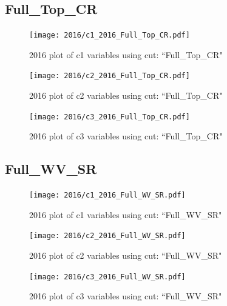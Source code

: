 \documentclass{article}
\begin{document}
      \subsection*{Full\_Top\_CR}
                        \begin{figure}[H]
                            \centering
                            \caption{2016 plot of c1 variables using cut: ``Full\_Top\_CR"}
                            \texttt{[image: 2016/c1\_2016\_Full\_Top\_CR.pdf]}
                        \end{figure}    
                        \begin{figure}[H]
                            \centering
                            \caption{2016 plot of c2 variables using cut: ``Full\_Top\_CR"}
                            \texttt{[image: 2016/c2\_2016\_Full\_Top\_CR.pdf]}
                        \end{figure}    
                        \begin{figure}[H]
                            \centering
                            \caption{2016 plot of c3 variables using cut: ``Full\_Top\_CR"}
                            \texttt{[image: 2016/c3\_2016\_Full\_Top\_CR.pdf]}
                        \end{figure}    
      \subsection*{Full\_WV\_SR}
                        \begin{figure}[H]
                            \centering
                            \caption{2016 plot of c1 variables using cut: ``Full\_WV\_SR"}
                            \texttt{[image: 2016/c1\_2016\_Full\_WV\_SR.pdf]}
                        \end{figure}    
                        \begin{figure}[H]
                            \centering
                            \caption{2016 plot of c2 variables using cut: ``Full\_WV\_SR"}
                            \texttt{[image: 2016/c2\_2016\_Full\_WV\_SR.pdf]}
                        \end{figure}    
                        \begin{figure}[H]
                            \centering
                            \caption{2016 plot of c3 variables using cut: ``Full\_WV\_SR"}
                            \texttt{[image: 2016/c3\_2016\_Full\_WV\_SR.pdf]}
                        \end{figure}    
\end{document}
